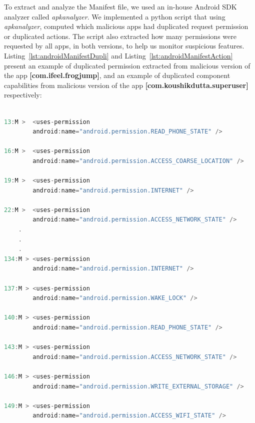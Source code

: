 To extract and analyze the Manifest file, we used an in-house Android SDK analyzer called \textit{apkanalyzer}. We implemented a python script that using \textit{apkanalyzer}, computed which malicious apps had duplicated request permission or duplicated actions. The script also extracted how many permissions were requested by all apps, in both versions, to help us monitor suspicious features. Listing~\ref{lst:androidManifestDupli} and Listing~\ref{lst:androidManifestAction} present an example of duplicated permission extracted from malicious version of the app \textbf{[com.ifeel.frogjump]}, and an example of duplicated component capabilities from malicious version of the app \textbf{[com.koushikdutta.superuser]} respectively:


\begin{lstlisting}[caption={Example of duplicated permission from malicious version of app (com.ifeel.frogjump)}, language=Java,
    basicstyle=\fontsize{6}{5}\selectfont\ttfamily,
    label={lst:androidManifestDupli}]

13:M >  <uses-permission
        android:name="android.permission.READ_PHONE_STATE" />

16:M >  <uses-permission
        android:name="android.permission.ACCESS_COARSE_LOCATION" />

19:M >  <uses-permission
        android:name="android.permission.INTERNET" />

22:M >  <uses-permission
        android:name="android.permission.ACCESS_NETWORK_STATE" />
    .
    .
    .
134:M > <uses-permission
        android:name="android.permission.INTERNET" />

137:M > <uses-permission
        android:name="android.permission.WAKE_LOCK" />

140:M > <uses-permission
        android:name="android.permission.READ_PHONE_STATE" />

143:M > <uses-permission
        android:name="android.permission.ACCESS_NETWORK_STATE" />

146:M > <uses-permission
        android:name="android.permission.WRITE_EXTERNAL_STORAGE" />

149:M > <uses-permission
        android:name="android.permission.ACCESS_WIFI_STATE" />
\end{lstlisting}


